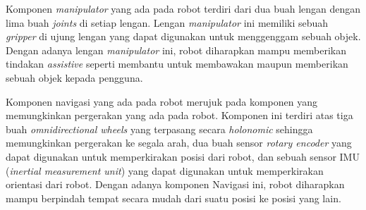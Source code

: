Komponen \emph{manipulator} yang ada pada robot terdiri dari dua buah lengan dengan lima buah \emph{joints} di setiap lengan.
Lengan \emph{manipulator} ini memiliki sebuah \emph{gripper} di ujung lengan yang dapat digunakan untuk menggenggam sebuah objek.
Dengan adanya lengan \emph{manipulator} ini,
  robot diharapkan mampu memberikan tindakan \emph{assistive} seperti membantu untuk membawakan maupun memberikan sebuah objek kepada pengguna.

Komponen navigasi yang ada pada robot merujuk pada komponen yang memungkinkan pergerakan yang ada pada robot.
Komponen ini terdiri atas tiga buah \emph{omnidirectional wheels} yang terpasang secara \emph{holonomic} sehingga memungkinkan pergerakan ke segala arah,
  dua buah sensor \emph{rotary encoder} yang dapat digunakan untuk memperkirakan posisi dari robot,
  dan sebuah sensor IMU (\emph{inertial measurement unit}) yang dapat digunakan untuk memperkirakan orientasi dari robot.
Dengan adanya komponen Navigasi ini,
  robot diharapkan mampu berpindah tempat secara mudah dari suatu posisi ke posisi yang lain.
